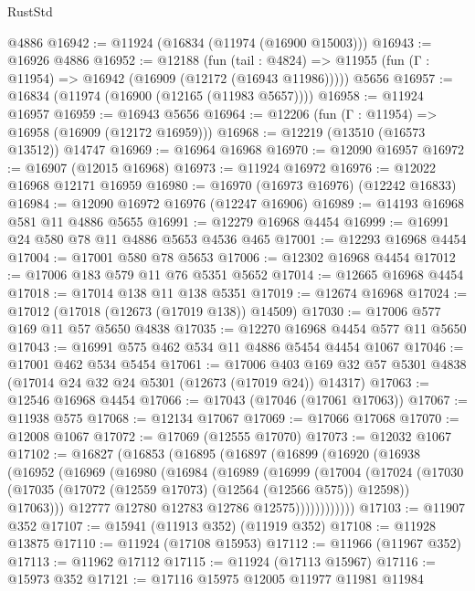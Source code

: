 \begin{lexlean}{RustStd}
\begin{coremodule}
    @4886
@16942 := @11924 (@16834 (@11974 (@16900 @15003)))
@16943 := @16926 @4886
@16952 := @12188
    (fun (tail : @4824) => @11955 (fun (Γ : @11954) => @16942 (@16909 (@12172 (@16943 @11986)))))
    @5656
@16957 := @16834 (@11974 (@16900 (@12165 (@11983 @5657))))
@16958 := @11924 @16957
@16959 := @16943 @5656
@16964 := @12206 (fun (Γ : @11954) => @16958 (@16909 (@12172 @16959)))
@16968 := @12219 (@13510 (@16573 @13512)) @14747
@16969 := @16964 @16968
@16970 := @12090 @16957
@16972 := @16907 (@12015 @16968)
@16973 := @11924 @16972
@16976 := @12022 @16968 @12171 @16959
@16980 := @16970 (@16973 @16976) (@12242 @16833)
@16984 := @12090 @16972 @16976 (@12247 @16906)
@16989 := @14193 @16968 @581 @11 @4886 @5655
@16991 := @12279 @16968 @4454
@16999 := @16991 @24 @580 @78 @11 @4886 @5653 @4536 @465
@17001 := @12293 @16968 @4454
@17004 := @17001 @580 @78 @5653
@17006 := @12302 @16968 @4454
@17012 := @17006 @183 @579 @11 @76 @5351 @5652
@17014 := @12665 @16968 @4454
@17018 := @17014 @138 @11 @138 @5351
@17019 := @12674 @16968
@17024 := @17012 (@17018 (@12673 (@17019 @138)) @14509)
@17030 := @17006 @577 @169 @11 @57 @5650 @4838
@17035 := @12270 @16968 @4454 @577 @11 @5650
@17043 := @16991 @575 @462 @534 @11 @4886 @5454 @4454 @1067
@17046 := @17001 @462 @534 @5454
@17061 := @17006
    @403
    @169
    @32
    @57
    @5301
    @4838
    (@17014 @24 @32 @24 @5301 (@12673 (@17019 @24)) @14317)
@17063 := @12546 @16968 @4454
@17066 := @17043 (@17046 (@17061 @17063))
@17067 := @11938 @575
@17068 := @12134 @17067
@17069 := @17066 @17068
@17070 := @12008 @1067
@17072 := @17069 (@12555 @17070)
@17073 := @12032 @1067
@17102 := @16827
    (@16853
      (@16895
        (@16897
          (@16899
            (@16920
              (@16938
                (@16952
                  (@16969
                    (@16980
                      (@16984
                        (@16989
                          (@16999
                            (@17004
                              (@17024
                                (@17030
                                  (@17035 (@17072 (@12559 @17073) (@12564 (@12566 @575)) @12598))
                                  @17063)))
                            @12777
                            @12780
                            @12783
                            @12786
                            @12575))))))))))))
@17103 := @11907 @352
@17107 := @15941 (@11913 @352) (@11919 @352)
@17108 := @11928 @13875
@17110 := @11924 (@17108 @15953)
@17112 := @11966 (@11967 @352)
@17113 := @11962 @17112
@17115 := @11924 (@17113 @15967)
@17116 := @15973 @352
@17121 := @17116 @15975 @12005 @11977 @11981 @11984

\end{coremodule}
\end{lexlean}
